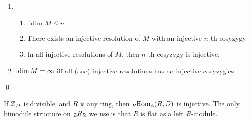 \documentclass[x11names,reqno,14pt]{extarticle}
\DeclareMathOperator{\idim}{idim}
\begin{document}
\begin{enumerate}


\item 

\begin{enumerate}[label=(\alph*)]

\item $\idim M \leq n$ 

\item There exists an injective resolution of $M$ with an injective $n$-th cosyzygy

\item In all injective resolutions of $M$, then $n$-th cosyzygy is injective.

\end{enumerate}

\item $\idim M = \oo$ iff all (one) injective resolutions has no injective cosyzygies.

\end{enumerate}

\proof

\qed

If $\mathbb{Z}_D$ is divisible, and $R$ is any ring, then $_R{\mathrm{Hom}}_{\mathbb{Z}}(R, D)$ is injective. The only bimodule structure on $_{\mathbb{Z}} R_R$ we use is that $R$ is flat as a left $R$-module.
\end{document}

